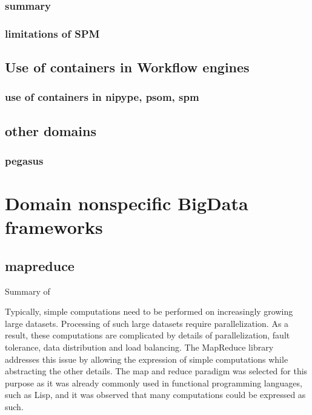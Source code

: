 \documentclass{report}
\begin{document}
        \subsection{summary} 
        \subsection{limitations of SPM} 
    \section{Use of containers in Workflow engines} 
        \subsection{use of containers in nipype, psom, spm}
        
       \section{other domains}
       	\subsection{pegasus}
		
\chapter{Domain nonspecific BigData frameworks} 
    \section{mapreduce}
        Summary of ~\cite{mapred}

        Typically, simple computations need to be performed on 
        increasingly growing large datasets. Processing of such 
        large datasets require parallelization. As a result, 
        these computations are complicated by details of 
        parallelization, fault tolerance, data distribution and 
        load balancing. The MapReduce library addresses this issue 
        by allowing the expression of simple computations while 
        abstracting the other details. The map and reduce paradigm 
        was selected for this purpose as it was already commonly 
        used in functional programming languages, such as Lisp, and 
        it was observed that many computations could be expressed 
        as such.
\end{document}
